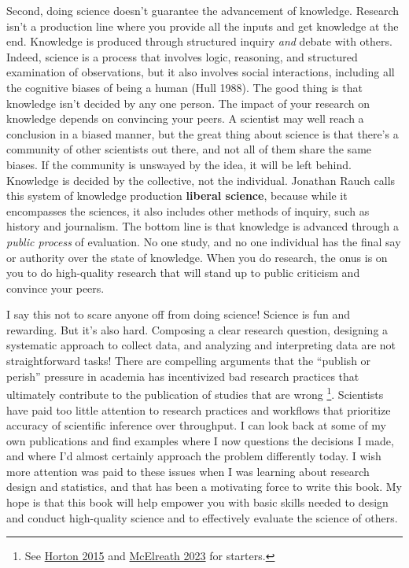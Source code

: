 \documentclass[
]{book}
\begin{document}
Second, doing science doesn't guarantee the advancement of knowledge. Research isn't a production line where you provide all the inputs and get knowledge at the end. Knowledge is produced through structured inquiry \emph{and} debate with others. Indeed, science is a process that involves logic, reasoning, and structured examination of observations, but it also involves social interactions, including all the cognitive biases of being a human (Hull 1988). The good thing is that knowledge isn't decided by any one person. The impact of your research on knowledge depends on convincing your peers. A scientist may well reach a conclusion in a biased manner, but the great thing about science is that there's a community of other scientists out there, and not all of them share the same biases. If the community is unswayed by the idea, it will be left behind. Knowledge is decided by the collective, not the individual. Jonathan Rauch calls this system of knowledge production \textbf{liberal science}, because while it encompasses the sciences, it also includes other methods of inquiry, such as history and journalism. The bottom line is that knowledge is advanced through a \emph{public process} of evaluation. No one study, and no one individual has the final say or authority over the state of knowledge. When you do research, the onus is on you to do high-quality research that will stand up to public criticism and convince your peers.

I say this not to scare anyone off from doing science! Science is fun and rewarding. But it's also hard. Composing a clear research question, designing a systematic approach to collect data, and analyzing and interpreting data are not straightforward tasks! There are compelling arguments that the ``publish or perish'' pressure in academia has incentivized bad research practices that ultimately contribute to the publication of studies that are wrong \footnote{See \href{https://www.thelancet.com/journals/lancet/article/PIIS0140-6736(15)60696-1/fulltext}{Horton 2015} and \href{https://elevanth.org/2023_06_13_Science_Dumpster_Fire.html}{McElreath 2023} for starters.}. Scientists have paid too little attention to research practices and workflows that prioritize accuracy of scientific inference over throughput. I can look back at some of my own publications and find examples where I now questions the decisions I made, and where I'd almost certainly approach the problem differently today. I wish more attention was paid to these issues when I was learning about research design and statistics, and that has been a motivating force to write this book. My hope is that this book will help empower you with basic skills needed to design and conduct high-quality science and to effectively evaluate the science of others.
\end{document}
